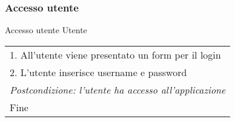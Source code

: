 \begin{minipage}{\textwidth}
    \subsubsection{Accesso utente}
    \usecase
        {Accesso utente}
        {Utente}
        {
            \begin{tabular}{l}
                1. All'utente viene presentato un form per il login\\
                2. L'utente inserisce username e password\\
                \textit{Postcondizione: l'utente ha accesso all'applicazione}\\
                Fine
            \end{tabular} \\
        }
        \vspace{0.5cm}
\end{minipage}